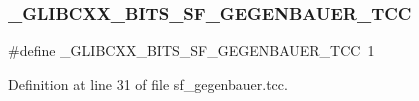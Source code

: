 \subsubsection{\texorpdfstring{\+\_\+\+G\+L\+I\+B\+C\+X\+X\+\_\+\+B\+I\+T\+S\+\_\+\+S\+F\+\_\+\+G\+E\+G\+E\+N\+B\+A\+U\+E\+R\+\_\+\+T\+CC}{\_GLIBCXX\_BITS\_SF\_GEGENBAUER\_TCC}}
{\footnotesize\ttfamily \#define \+\_\+\+G\+L\+I\+B\+C\+X\+X\+\_\+\+B\+I\+T\+S\+\_\+\+S\+F\+\_\+\+G\+E\+G\+E\+N\+B\+A\+U\+E\+R\+\_\+\+T\+CC~1}



Definition at line 31 of file sf\+\_\+gegenbauer.\+tcc.

